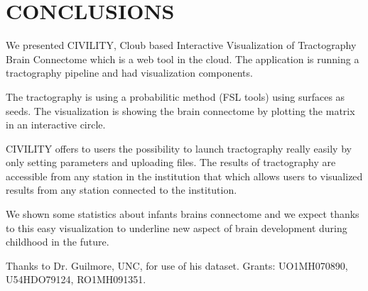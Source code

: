 \documentclass[]{spie}  %
\begin{document}
\section{CONCLUSIONS} 

We presented CIVILITY, Cloub based Interactive Visualization of Tractography Brain Connectome which is a  web tool in the cloud. The application is running a tractography pipeline and had visualization components. 

The tractography is using a probabilitic method (FSL tools) using surfaces as seeds. 
The visualization is showing the brain connectome by plotting the matrix in an interactive circle. 

CIVILITY offers to users the possibility to launch tractography really easily by only setting parameters and uploading files. 
The results of tractography are accessible from any station in the institution that which allows users to visualized results from any station connected to the institution. 

We shown some statistics about infants brains connectome and we expect thanks to this easy visualization to underline new aspect of brain development during childhood in the future.








\acknowledgments

Thanks to Dr. Guilmore, UNC, for use of his dataset. Grants: UO1MH070890, U54HDO79124, RO1MH091351. 


\end{document}
